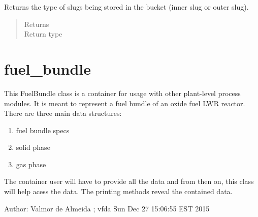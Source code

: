 \documentclass[letterpaper,10pt,openany,oneside,english]{sphinxmanual}
\begin{document}
\begin{fulllineitems}

\begin{fulllineitems}
\label{\detokenize{support_rst/fuel_bucket:fuel_bucket.FuelBucket.slug_type}}
Returns the type of slugs being stored in the bucket (inner slug or
outer slug).
\begin{quote}\begin{description}
\item[{Returns}] \leavevmode
{}

\item[{Return type}] \leavevmode
{}

\end{description}\end{quote}

\end{fulllineitems}


\end{fulllineitems}



\section{fuel\_bundle}
\label{\detokenize{support_rst/fuel_bundle:module-fuel_bundle}}\label{\detokenize{support_rst/fuel_bundle:fuel-bundle}}\label{\detokenize{support_rst/fuel_bundle::doc}}
This FuelBundle class is a container for usage with other plant-level process modules.
It is meant to represent a fuel bundle of an oxide fuel LWR reactor.
There are three main data structures:
\begin{enumerate}
\item {} 
fuel bundle specs

\item {} 
solid phase

\item {} 
gas phase

\end{enumerate}

The container user will have to provide all the data and from then on, this class
will help acess the data.
The printing methods reveal the contained data.

Author: Valmor de Almeida ; vfda
Sun Dec 27 15:06:55 EST 2015
\end{document}
